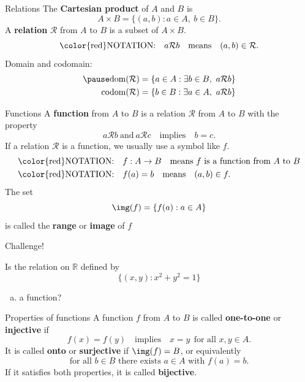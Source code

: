 \documentclass{beamer}
\begin{document}
\begin{frame}{Relations}
The \textbf{Cartesian product} of $A$ and $B$ is
$$A\times B = \{(a,b): a\in A,\ b\in B\}.$$
\pause
A \textbf{relation} $\mathcal R$ from $A$ to $B$ is a subset of $A\times B$.\\
\pause
$$\text{\color{red}NOTATION:}\quad a\mathcal R b\quad\text{means}\quad (a,b)\in \mathcal R.$$
\pause
Domain and codomain:
\pause
\begin{align*}
\pause
\text{dom}(\mathcal{R}) &= \{a\in A: \exists b\in B,\ a\mathcal R b\}\\
\text{codom}(\mathcal{R}) &= \{b\in B: \exists a\in A,\ a\mathcal R b\}
\end{align*}
\end{frame}


\begin{frame}{Functions}
A \textbf{function} from $A$ to $B$ is a relation $\mathcal R$ from $A$ to $B$ with the property
\pause
$$a\mathcal Rb\ \text{and}\ a\mathcal Rc\quad\text{implies}\quad b=c.$$
\pause
If a relation $\mathcal R$ is a function, we usually use a symbol like $f$.\\
\pause
\begin{align*}
\text{\color{red}NOTATION:}&\quad f: A\rightarrow B\quad\text{means $f$ is a function from $A$ to $B$}\\
\text{\color{red}NOTATION:}&\quad f(a) = b\quad\text{means}\quad (a,b)\in f.
\end{align*}
\pause
The set $$\img(f) = \{f(a): a\in A\}$$ is called the \textbf{range} or \textbf{image} of $f$
\end{frame}

\begin{frame}{Challenge!}
\begin{prob}
Is the relation on $\mathbb{R}$ defined by
$$\{(x,y): x^2+y^2=1\}$$
\begin{enumerate}[(a)]
\pause
\item a function?
\end{enumerate}
\end{prob}
\end{frame}

\begin{frame}{Properties of functions}
A function $f$ from $A$ to $B$ is called \textbf{one-to-one} or \textbf{injective} if 
\pause
$$f(x) = f(y) \quad\text{implies}\quad x=y\ \ \text{for all $x,y\in A$}.$$
\pause
It is called \textbf{onto} or \textbf{surjective} if $\img(f) = B$, or equivalently
$$\text{for all $b\in B$ there exists $a\in A$ with $f(a) =b$}.$$
\pause
If it satisfies both properties, it is called \textbf{bijective}.
\end{frame}
\end{document}
